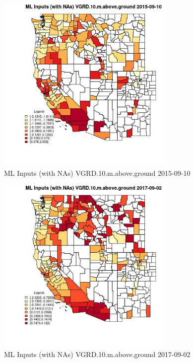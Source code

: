 \begin{figure} 
\centering  
\includegraphics[width=0.77\textwidth]{Code_Outputs/Report_ML_input_PM25_Step4_part_e_de_duplicated_aves_compiled_2019-05-21wNAs_CountyVGRD10mabovegroundMean2015-09-10.jpg} 
\caption{\label{fig:Report_ML_input_PM25_Step4_part_e_de_duplicated_aves_compiled_2019-05-21wNAsCountyVGRD10mabovegroundMean2015-09-10}ML Inputs (with NAs) VGRD.10.m.above.ground 2015-09-10} 
\end{figure} 
 

\begin{figure} 
\centering  
\includegraphics[width=0.77\textwidth]{Code_Outputs/Report_ML_input_PM25_Step4_part_e_de_duplicated_aves_compiled_2019-05-21wNAs_CountyVGRD10mabovegroundMean2017-09-02.jpg} 
\caption{\label{fig:Report_ML_input_PM25_Step4_part_e_de_duplicated_aves_compiled_2019-05-21wNAsCountyVGRD10mabovegroundMean2017-09-02}ML Inputs (with NAs) VGRD.10.m.above.ground 2017-09-02} 
\end{figure} 
 

